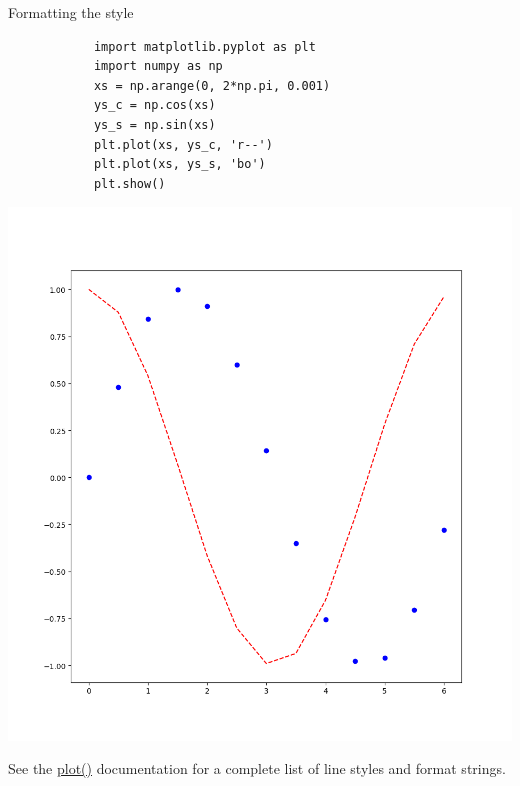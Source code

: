\documentclass[aspectratio=169,handout]{beamer}
\begin{document}
\begin{frame}[fragile]{Formatting the style}
    \begin{minipage}{0.49\textwidth}
        \begin{verbatim}
            import matplotlib.pyplot as plt
            import numpy as np
            xs = np.arange(0, 2*np.pi, 0.001)
            ys_c = np.cos(xs)
            ys_s = np.sin(xs)
            plt.plot(xs, ys_c, 'r--')
            plt.plot(xs, ys_s, 'bo')
            plt.show()
        \end{verbatim}
    \end{minipage}
    \pause
    \begin{minipage}{0.49\textwidth}
        \centering
        \includegraphics[width=.8\textwidth]{./plots/plot3.png}
    \end{minipage}
    See the \href{https://matplotlib.org/api/_as_gen/matplotlib.pyplot.plot.html#matplotlib.pyplot.plot}{plot()}
    documentation for a complete list of line styles and format strings.
\end{frame}
\end{document}
